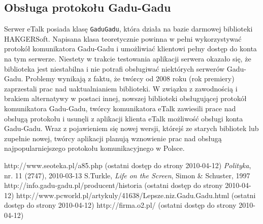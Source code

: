 \documentclass[a4paper,12pt]{article}
\begin{document}
\subsection[Obsługa protokołu Gadu-Gadu]{Obsługa protokołu Gadu-Gadu}
Serwer eTalk posiada klasę \texttt{GaduGadu}, która działa na bazie darmowej biblioteki HAKGERSoft.
Napisana klasa teoretycznie powinna w pełni wykorzystywać protokół komunikatora Gadu-Gadu i umożliwiać klientowi pełny dostęp do konta na tym serwerze. Niestety w trakcie testowania aplikacji serwera okazało się, że biblioteka jest niestabilna i nie potrafi obsługiwać niektórych serwerów Gadu-Gadu. Problemy wynikają z faktu, że twórcy od 2008 roku (rok premiery) zaprzestali prac nad uaktualnianiem biblioteki. W związku z zawodnością i brakiem alternatywy w postaci innej, nowszej biblioteki obsługującej protokół komunikatora Gadu-Gadu, twórcy komunikatora eTalk zawiesili prace nad obsługą protokołu i usunęli z aplikacji klienta eTalk możliwość obsługi konta Gadu-Gadu.
Wraz z pojawieniem się nowej wersji, którejś ze starych bibliotek lub zupełnie nowej, twórcy aplikacji planują wznowienie prac nad obsługą najpopularniejszego protokołu komunikacyjnego w Polsce.

\begin{thebibliography}{9}
 http://www.seoteka.pl/a85.php (ostatni dostęp do strony 2010-04-12)
 \emph{Polityka}, nr. 11 (2747), 2010-03-13
 S.Turkle, \emph{Life on the Screen}, Simon \& Schuster, 1997
 http://info.gadu-gadu.pl/producent/historia (ostatni dostęp do strony 2010-04-12)
 http://www.pcworld.pl/artykuly/41638/Lepsze.niz.Gadu.Gadu.html (ostatni dostęp do strony 2010-04-12)
 http://firma.o2.pl/ (ostatni dostęp do strony 2010-04-12)
\end{thebibliography}
\end{document}
